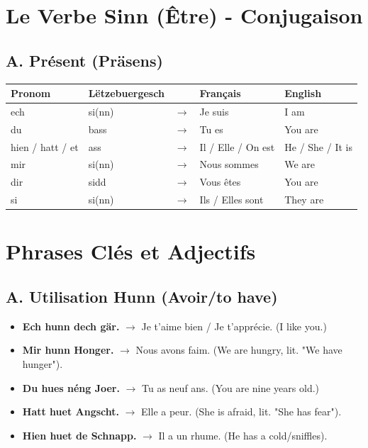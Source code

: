 	\section{Le Verbe \textbf{Sinn} (Être) - Conjugaison}
	\subsection*{A. Présent (Präsens)}
	\begin{tabular}{ll c l l}
		\toprule
		\textbf{Pronom} & \textbf{Lëtzebuergesch} & \textbf{} & \textbf{Français} & \textbf{English} \\
		\midrule
		ech & si(nn) & $\rightarrow$ & Je suis & I am \\
		du & bass & $\rightarrow$ & Tu es & You are \\
		hien / hatt / et & ass & $\rightarrow$ & Il / Elle / On est & He / She / It is \\
		\midrule
		mir & si(nn) & $\rightarrow$ & Nous sommes & We are \\
		dir & sidd & $\rightarrow$ & Vous êtes & You are \\
		si & si(nn) & $\rightarrow$ & Ils / Elles sont & They are \\
		\bottomrule
	\end{tabular}
	
	\section{Phrases Clés et Adjectifs}
	
	\subsection*{A. Utilisation \textbf{Hunn} (Avoir/to have)}
	\begin{itemize}
		\item \textbf{Ech hunn dech gär.} \quad $\rightarrow$ Je t'aime bien / Je t'apprécie. (I like you.)
		\item \textbf{Mir hunn Honger.} \quad $\rightarrow$ Nous avons faim. (We are hungry, lit. "We have hunger").
		\item \textbf{Du hues néng Joer.} \quad $\rightarrow$ Tu as neuf ans. (You are nine years old.)
		\item \textbf{Hatt huet Angscht.} \quad $\rightarrow$ Elle a peur. (She is afraid, lit. "She has fear").
		\item \textbf{Hien huet de Schnapp.} \quad $\rightarrow$ Il a un rhume. (He has a cold/sniffles).
	\end{itemize}
	
